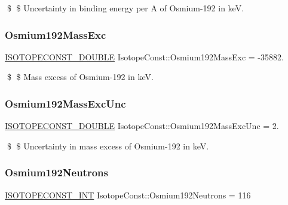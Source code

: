 \$ \$ Uncertainty in binding energy per A of Osmium-\/192 in keV. \mbox{\label{group___isotope_const-_osmium-_os192_gaadb90862f21baa8bf9cd648b337bcd30}} 
\subsubsection{\texorpdfstring{Osmium192\+Mass\+Exc}{Osmium192MassExc}}
{\footnotesize\ttfamily \mbox{\hyperlink{group___isotope_const-_macros_ga8f45a7272ce02c0b4c65c44636ed719a}{I\+S\+O\+T\+O\+P\+E\+C\+O\+N\+S\+T\+\_\+\+D\+O\+U\+B\+LE}} Isotope\+Const\+::\+Osmium192\+Mass\+Exc = -\/35882.}

\$ \$ Mass excess of Osmium-\/192 in keV. \mbox{\label{group___isotope_const-_osmium-_os192_ga98a5115d5b338d6de05a3fc2c02aba91}} 
\subsubsection{\texorpdfstring{Osmium192\+Mass\+Exc\+Unc}{Osmium192MassExcUnc}}
{\footnotesize\ttfamily \mbox{\hyperlink{group___isotope_const-_macros_ga8f45a7272ce02c0b4c65c44636ed719a}{I\+S\+O\+T\+O\+P\+E\+C\+O\+N\+S\+T\+\_\+\+D\+O\+U\+B\+LE}} Isotope\+Const\+::\+Osmium192\+Mass\+Exc\+Unc = 2.}

\$ \$ Uncertainty in mass excess of Osmium-\/192 in keV. \mbox{\label{group___isotope_const-_osmium-_os192_gaeba9ebc6413583cfd1833acdf58f154e}} 
\subsubsection{\texorpdfstring{Osmium192\+Neutrons}{Osmium192Neutrons}}
{\footnotesize\ttfamily \mbox{\hyperlink{group___isotope_const-_macros_ga5f18360b3e99483a35c32d789e62621c}{I\+S\+O\+T\+O\+P\+E\+C\+O\+N\+S\+T\+\_\+\+I\+NT}} Isotope\+Const\+::\+Osmium192\+Neutrons = 116}


